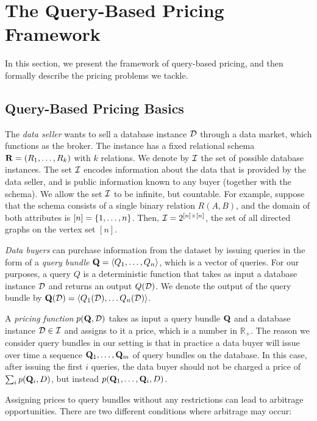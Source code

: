 \section{The Query-Based Pricing Framework}
\label{sec:framework}

In this section, we present the framework of query-based pricing, and then formally describe the pricing problems we tackle.

\subsection{Query-Based Pricing Basics}

The {\em data seller} wants to sell a database instance $\mathcal{D}$ through a data market, which functions as the broker. The instance has a fixed relational schema $\mathbf{R} = (R_1, \dots, R_k)$ with $k$ relations. We denote by $\mathcal{I}$ the set of possible database instances. The set $\mathcal{I}$ encodes information about the data that is provided by the data seller, and is public information known to any buyer (together with the schema). We allow the set $\mathcal{I}$ to be infinite, but countable. For example, suppose that the schema consists of a single binary relation $R(A,B)$, and the domain of both attributes is $[n] = \{1, \dots, n\}$. Then, $\mathcal{I} = 2^{[n] \times [n]}$, \ie the set of all directed graphs on the vertex set $[n]$.

{\em Data buyers} can purchase information from the dataset by issuing queries in the form of a {\em query bundle}  $\mathbf{Q}=\langle {Q_1, \hdots, Q_n} \rangle$, which is a vector of queries. For our purposes, a query $Q$ is a deterministic function that takes as input a database instance $\mathcal{D}$ and returns an output $Q(\mathcal{D})$.  
We denote the output of the query bundle by $\mathbf{Q}(\mathcal{D}) = \langle {Q_1(\mathcal{D}), \hdots Q_n(\mathcal{D})} \rangle$. 

A {\em pricing function} $p(\mathbf{Q}, \mathcal{D})$ takes as input a query bundle $\mathbf{Q}$ and a database instance $\mathcal{D} \in \mathcal{I}$ and assigns to it a price, which is a number in $ \mathbb{R}_+$. 
The reason we consider query bundles in our setting is that in practice a data buyer will issue over time a sequence $\mathbf{Q}_1, \dots, \mathbf{Q}_m$ of query bundles on the database. In this case, after issuing the first $i$ queries, the data buyer should not be charged a price of $\sum_i p(\mathbf{Q}_i,D)$, but instead $p(\mathbf{Q}_1, \dots, \mathbf{Q}_i, D)$. 

Assigning prices to query bundles without any restrictions can lead to arbitrage opportunities. There are two different conditions where arbitrage may occur:

